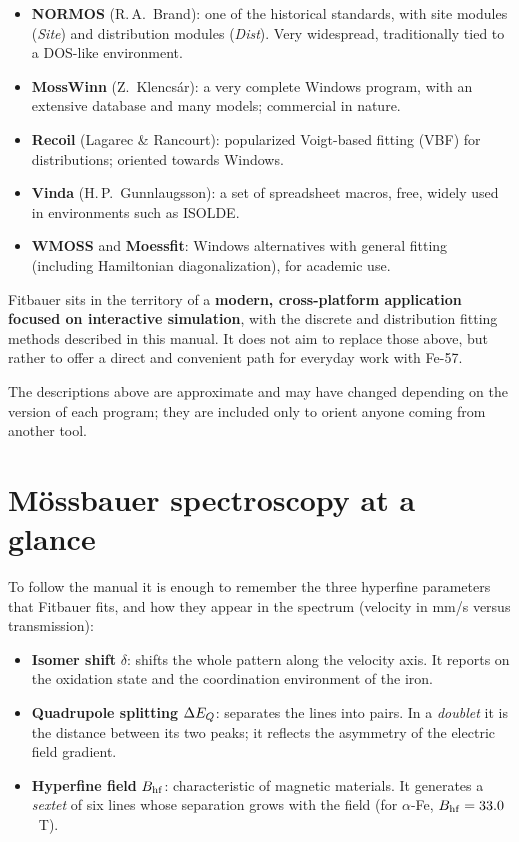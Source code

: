 \begin{itemize}[nosep]
  \item \textbf{NORMOS} (R.\,A.\ Brand): one of the historical standards, with
        site modules (\emph{Site}) and distribution modules (\emph{Dist}). Very
        widespread, traditionally tied to a DOS-like environment.
  \item \textbf{MossWinn} (Z.\ Klencsár): a very complete Windows program, with
        an extensive database and many models; commercial in nature.
  \item \textbf{Recoil} (Lagarec \& Rancourt): popularized Voigt-based
        fitting (VBF) for distributions; oriented towards Windows.
  \item \textbf{Vinda} (H.\,P.\ Gunnlaugsson): a set of spreadsheet
        macros, free, widely used in environments such as ISOLDE.
  \item \textbf{WMOSS} and \textbf{Moessfit}: Windows alternatives with general
        fitting (including Hamiltonian diagonalization), for academic use.
\end{itemize}

Fitbauer sits in the territory of a \textbf{modern,
cross-platform application focused on interactive simulation}, with the discrete
and distribution fitting methods described in this manual. It does not aim to
replace those above, but rather to offer a direct and convenient path for everyday
work with Fe-57.

\begin{nota}
The descriptions above are approximate and may have changed depending on the
version of each program; they are included only to orient anyone coming from another
tool.
\end{nota}

\section{Mössbauer spectroscopy at a glance}
\label{sec:mossbauer-vistazo}

To follow the manual it is enough to remember the three hyperfine parameters that
Fitbauer fits, and how they appear in the spectrum (velocity in mm/s versus
transmission):

\begin{itemize}[nosep]
  \item \textbf{Isomer shift} $\delta$: shifts the whole pattern along
        the velocity axis. It reports on the oxidation state and the
        coordination environment of the iron.
  \item \textbf{Quadrupole splitting} $\Delta E_{Q}$: separates the lines into pairs.
        In a \emph{doublet} it is the distance between its two peaks; it reflects
        the asymmetry of the electric field gradient.
  \item \textbf{Hyperfine field} $B_{\mathrm{hf}}$: characteristic of magnetic materials.
        It generates a \emph{sextet} of six lines whose separation grows with the
        field (for $\alpha$-Fe, $B_{\mathrm{hf}} = 33.0$~T).
\end{itemize}

